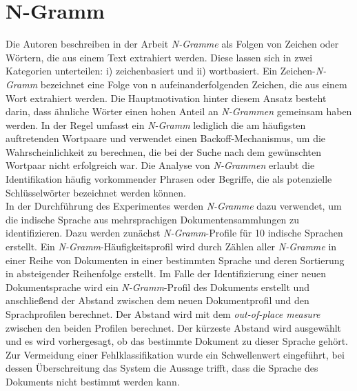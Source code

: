 \section{N-Gramm}
Die Autoren \citeauthor{majumder2002n} beschreiben in der Arbeit \cite{majumder2002n} \emph{N-Gramme} als Folgen von Zeichen oder Wörtern, die aus einem Text extrahiert werden. Diese lassen sich in zwei Kategorien unterteilen: i) zeichenbasiert und ii) wortbasiert. Ein Zeichen-\emph{N-Gramm} bezeichnet eine Folge von n aufeinanderfolgenden Zeichen, die aus einem Wort extrahiert werden. Die Hauptmotivation hinter diesem Ansatz besteht darin, dass ähnliche Wörter einen hohen Anteil an \emph{N-Grammen} gemeinsam haben werden. In der Regel umfasst ein \emph{N-Gramm} lediglich die am häufigsten auftretenden Wortpaare und verwendet einen Backoff-Mechanismus, um die Wahrscheinlichkeit zu berechnen, die bei der Suche nach dem gewünschten Wortpaar nicht erfolgreich war. Die Analyse von \emph{N-Grammen} erlaubt die Identifikation häufig vorkommender Phrasen oder Begriffe, die als potenzielle Schlüsselwörter bezeichnet werden können.\\
In der Durchführung des Experimentes werden \emph{N-Gramme} dazu verwendet, um die indische Sprache aus mehrsprachigen Dokumentensammlungen zu identifizieren. Dazu werden zunächst \emph{N-Gramm}-Profile für 10 indische Sprachen erstellt. Ein \emph{N-Gramm}-Häufigkeitsprofil wird durch Zählen aller \emph{N-Gramme} in einer Reihe von Dokumenten in einer bestimmten Sprache und deren Sortierung in absteigender Reihenfolge erstellt. Im Falle der Identifizierung einer neuen Dokumentsprache wird ein \emph{N-Gramm}-Profil des Dokuments erstellt und anschließend der Abstand zwischen dem neuen Dokumentprofil und den Sprachprofilen berechnet. Der Abstand wird mit dem \emph{out-of-place measure} zwischen den beiden Profilen berechnet. Der kürzeste Abstand wird ausgewählt und es wird vorhergesagt, ob das bestimmte Dokument zu dieser Sprache gehört. Zur Vermeidung einer Fehlklassifikation wurde ein Schwellenwert eingeführt, bei dessen Überschreitung das System die Aussage trifft, dass die Sprache des Dokuments nicht bestimmt werden kann.

